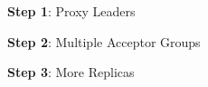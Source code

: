 \textbf{Step 1}: Proxy Leaders

{}

\vspace{1in}
\textbf{Step 2}: Multiple Acceptor Groups

{}

\vspace{1in}
\textbf{Step 3}: More Replicas

{}
